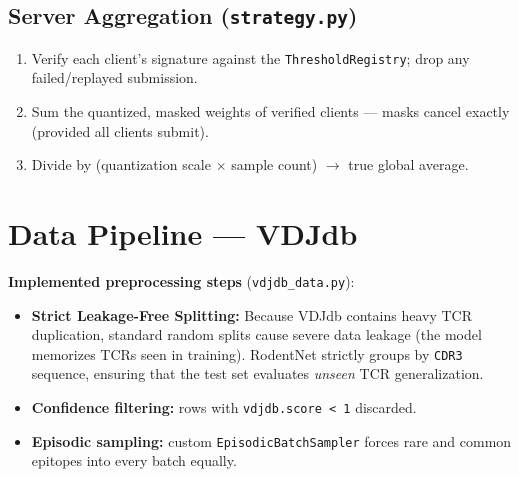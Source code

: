 \documentclass[11pt,a4paper]{article}
\begin{document}
\subsection{Server Aggregation (\lstinline|strategy.py|)}
\begin{enumerate}[itemsep=2pt]
  \item Verify each client's signature against the \lstinline|ThresholdRegistry|; drop any failed/replayed submission.
  \item Sum the quantized, masked weights of verified clients --- masks cancel exactly (provided all clients submit).
  \item Divide by (quantization scale $\times$ sample count) $\to$ true global average.
\end{enumerate}

\section{Data Pipeline --- VDJdb}
\label{sec:data}

\textbf{Implemented preprocessing steps} (\lstinline|vdjdb_data.py|):
\begin{itemize}[itemsep=2pt]
  \item \textbf{Strict Leakage-Free Splitting:} Because VDJdb contains heavy TCR duplication, standard random splits cause severe data leakage (the model memorizes TCRs seen in training). RodentNet strictly groups by \lstinline|CDR3| sequence, ensuring that the test set evaluates \emph{unseen} TCR generalization.
  \item \textbf{Confidence filtering:} rows with \lstinline|vdjdb.score < 1| discarded.
  \item \textbf{Episodic sampling:} custom \lstinline|EpisodicBatchSampler| forces rare and common epitopes into every batch equally.
\end{itemize}

\end{document}
